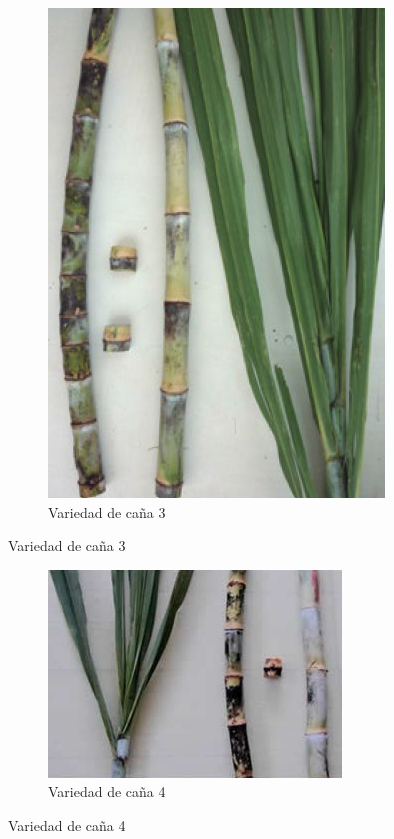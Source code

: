\documentclass{article}%
\begin{document}
\begin{figure}[h!]
\begin{subfigure}{0.33\linewidth}
\includegraphics[width=0.95\linewidth]{Cana/CP75-11.png}%
\caption{Variedad de caña 3}%
\end{subfigure}%
\linebreak%
\newpage%
\end{figure}

%


\begin{figure}[h!]%
\begin{subfigure}{0.33\linewidth}%
\includegraphics[width=0.95\linewidth]{Cana/RD75-11.png}%
\caption{Variedad de caña 4}%
\end{subfigure}%
\linebreak%
\newpage%
\end{figure}
\end{document}
